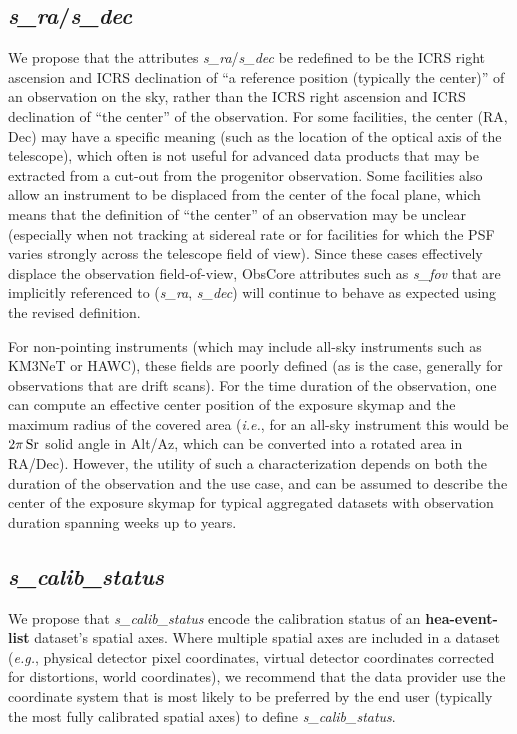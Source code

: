 \documentclass[11pt,a4paper]{ivoa}
\begin{document}
\subsection{{\em s\_ra\/}/{\em s\_dec}}

We propose that the attributes {\em s\_ra\/}/{\em s\_dec\/} be redefined to be the ICRS right ascension and ICRS declination of ``a reference position (typically the center)'' of an observation on the sky, rather than the ICRS right ascension and ICRS declination of ``the center'' of the observation.  For some facilities, the center (RA, Dec) may have a specific meaning (such as the location of the optical axis of the telescope), which often is not useful for advanced data products that may be extracted from a cut-out from the progenitor observation.  Some facilities also allow an instrument to be displaced from the center of the focal plane, which means that the definition of ``the center'' of an observation may be unclear (especially when not tracking at sidereal rate or for facilities for which the PSF varies strongly across the telescope field of view).  Since these cases effectively displace the observation field-of-view, ObsCore attributes such as {\em s\_fov\/} that are implicitly referenced to ({\em s\_ra\/}, {\em s\_dec\/}) will continue to behave as expected using the revised definition.

For non-pointing instruments (which may include all-sky instruments such as KM3NeT or HAWC), these fields are poorly defined (as is the case, generally for observations that are drift scans).  For the time duration of the observation, one can compute an effective center position of the exposure skymap and the maximum radius of the covered area ({\em i.e.\/}, for an all-sky instrument this would be $2\pi\,\rm Sr$ solid angle in Alt/Az, which can be converted into a rotated area in RA/Dec). However, the utility of such a characterization depends on both the duration of the observation and the use case, and can be assumed to describe the center of the exposure skymap for typical aggregated datasets with observation duration spanning weeks up to years.

\subsection{{\em s\_calib\_status}}

We propose that {\em s\_calib\_status\/} encode the calibration status of an {\bf hea-event-list} dataset's spatial axes. Where multiple spatial axes are included in a dataset ({\em e.g.\/}, physical detector pixel coordinates, virtual detector coordinates corrected for distortions, world coordinates), we recommend that the data provider use the coordinate system that is most likely to be preferred by the end user (typically the most fully calibrated spatial axes) to define {\em s\_calib\_status\/}.
\end{document}

